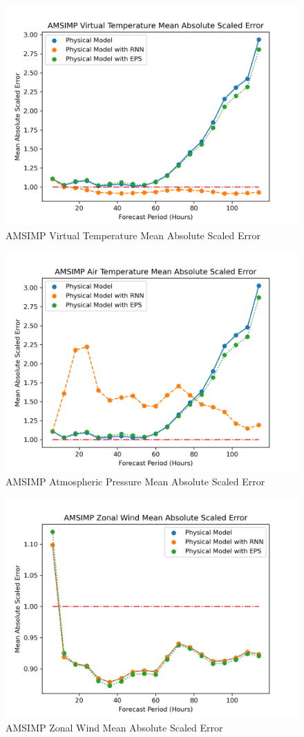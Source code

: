 \begin{appendices}
    \begin{figure}[H]
        \centering
        \includegraphics[width=.7\linewidth]{Graphs/accuracy/appendices/amsimp/virtual_temperature/mean_absolute_scaled_error.png}
        \caption{AMSIMP Virtual Temperature Mean Absolute Scaled Error}
    \end{figure}
    
    \begin{figure}[H]
        \centering
        \includegraphics[width=.7\linewidth]{Graphs/accuracy/appendices/amsimp/geopotential_height/mean_absolute_scaled_error.png}
        \caption{AMSIMP Atmospheric Pressure Mean Absolute Scaled Error}
    \end{figure}
    
    \begin{figure}[H]
        \centering
        \includegraphics[width=.7\linewidth]{Graphs/accuracy/appendices/amsimp/zonal_wind/mean_absolute_scaled_error.png}
        \caption{AMSIMP Zonal Wind Mean Absolute Scaled Error}
    \end{figure}
    

\end{appendices}
